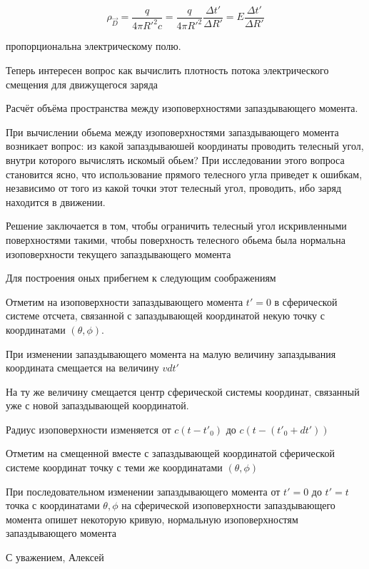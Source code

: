 \documentclass{article}
\begin{document}
$$\rho_{\vec D} = \frac{q}{4\pi {R'}^2 c} =  \frac{q}{4\pi {R'}^2}\frac{\Delta t'}{\Delta R'} = E\frac{\Delta t'}{\Delta R'}$$

пропорциональна электрическому полю.

Теперь интересен вопрос как вычислить плотность потока электрического смещения для движущегося заряда

Расчёт объёма пространства между изоповерхностями запаздывающего момента.

При вычислении обьема между изоповерхностями запаздывающего момента возникает вопрос: из какой запаздываюшей координаты проводить телесный угол, внутри которого вычислять искомый обьем? При исследовании этого вопроса становится ясно, что использование прямого телесного угла приведет к ошибкам, независимо от того из какой точки этот телесный угол, проводить, ибо заряд находится в движении. 

Решение заключается в том, чтобы ограничить телесный угол искривленными поверхностями такими, чтобы поверхность телесного обьема была нормальна изоповерхности текущего запаздывающего момента

Для построения оных прибегнем к следующим соображениям 

Отметим на изоповерхности запаздывающего момента $t'=0$ в сферической системе отсчета, связанной с запаздывающей координатой некую точку с координатами $(\theta, \phi)$.

При изменении запаздывающего момента на малую величину запаздывания координата смещается на величину $v dt'$

На ту же величину смещается центр сферической системы координат, связанный уже с новой запаздывающей координатой.

Радиус изоповерхности изменяется от $c(t-t'_{0})$ до $c(t-(t'_{0} + d t'))$

Отметим на смещенной вместе с запаздывающей координатой сферической системе координат точку с теми же координатами $(\theta, \phi)$

При последовательном изменении запаздывающего момента от $t'=0$ до $t'=t$ точка с координатами $\theta, \phi$ на сферической изоповерхности запаздывающего момента опишет некоторую кривую, нормальную изоповерхностям запаздывающего момента



С уважением, Алексей
\end{document}
